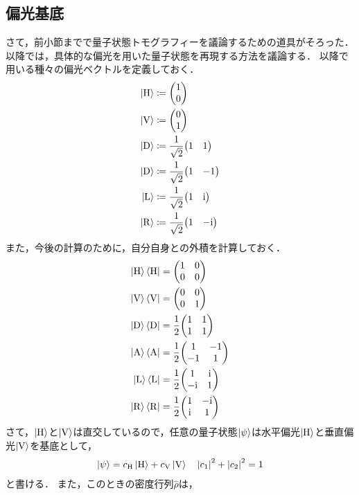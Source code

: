 \documentclass{report}
\begin{document}
  \subsection{偏光基底}
    さて，前小節までで量子状態トモグラフィーを議論するための道具がそろった．
    以降では，具体的な偏光を用いた量子状態を再現する方法を議論する． %
    以降で用いる種々の偏光ベクトルを定義しておく．
    \begin{align}
      \ketH &\coloneqq \mqty(1 \\ 0) \\ 
      \ketV &\coloneqq \mqty(0 \\ 1) \\ 
      \ketD &\coloneqq \frac{1}{\sqrt{2}}\mqty(1 & 1) \\ 
      \ketD &\coloneqq \frac{1}{\sqrt{2}}\mqty(1 & -1) \\ 
      \ketL &\coloneqq \frac{1}{\sqrt{2}}\mqty(1 & \i) \\ 
      \ketR &\coloneqq \frac{1}{\sqrt{2}}\mqty(1 & -\i)
    \end{align}
    また，今後の計算のために，自分自身との外積を計算しておく．
    \begin{align}
      \ketH\braH &= \mqty(1 & 0 \\ 0 & 0) \label{outer-product-h} \\ 
      \ketV\braV &= \mqty(0 & 0 \\ 0 & 1) \label{outer-product-v} \\ 
      \ketD\braD &= \frac{1}{2}\mqty(1 & 1 \\ 1 & 1) \label{outer-product-d} \\ 
      \ketA\braA &= \frac{1}{2}\mqty(1 & -1 \\ -1 & 1) \label{outer-product-a} \\ 
      \ketL\braL &= \frac{1}{2}\mqty(1 & \i \\ -\i & 1) \label{outer-product-l} \\ 
      \ketR\braR &= \frac{1}{2}\mqty(1 & -\i \\ \i & 1) \label{outer-product-r}
    \end{align}
    さて，$\ket{\mathrm{H}}$と$\ket{\mathrm{V}}$は直交しているので，任意の量子状態$\ket{\psi}$は水平偏光$\ket{\mathrm{H}}$と垂直偏光$\ket{\mathrm{V}}$を基底として，
    \begin{align}
      \ket{\psi} = c_{\mathrm{H}}\ket{\mathrm{H}} + c_{\mathrm{V}}\ket{\mathrm{V}} \quad \abs{c_1}^2 + \abs{c_2}^2 = 1
    \end{align}
    と書ける．
    また，このときの密度行列$\hat{\rho}$は，
\end{document}
